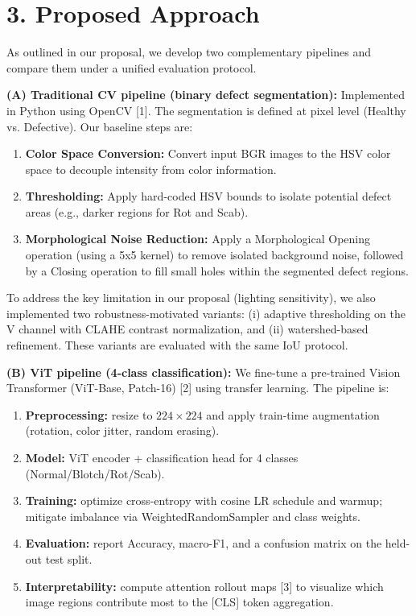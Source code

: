 \documentclass[11pt,letterpaper]{article}
\begin{document}
\section*{3. Proposed Approach}
As outlined in our proposal, we develop two complementary pipelines and compare them under a unified evaluation protocol.

\textbf{(A) Traditional CV pipeline (binary defect segmentation):} Implemented in Python using OpenCV [1]. The segmentation is defined at pixel level (Healthy vs. Defective). Our baseline steps are:
\begin{enumerate}[noitemsep, topsep=0pt]
    \item \textbf{Color Space Conversion:} Convert input BGR images to the HSV color space to decouple intensity from color information.
    \item \textbf{Thresholding:} Apply hard-coded HSV bounds to isolate potential defect areas (e.g., darker regions for Rot and Scab).
    \item \textbf{Morphological Noise Reduction:} Apply a Morphological Opening operation (using a 5x5 kernel) to remove isolated background noise, followed by a Closing operation to fill small holes within the segmented defect regions.
\end{enumerate}
To address the key limitation in our proposal (lighting sensitivity), we also implemented two robustness-motivated variants: (i) adaptive thresholding on the V channel with CLAHE contrast normalization, and (ii) watershed-based refinement. These variants are evaluated with the same IoU protocol.

\textbf{(B) ViT pipeline (4-class classification):} We fine-tune a pre-trained Vision Transformer (ViT-Base, Patch-16) [2] using transfer learning. The pipeline is:
\begin{enumerate}[noitemsep, topsep=0pt]
    \item \textbf{Preprocessing:} resize to $224\times 224$ and apply train-time augmentation (rotation, color jitter, random erasing).
    \item \textbf{Model:} ViT encoder + classification head for 4 classes (Normal/Blotch/Rot/Scab).
    \item \textbf{Training:} optimize cross-entropy with cosine LR schedule and warmup; mitigate imbalance via WeightedRandomSampler and class weights.
    \item \textbf{Evaluation:} report Accuracy, macro-F1, and a confusion matrix on the held-out test split.
    \item \textbf{Interpretability:} compute attention rollout maps [3] to visualize which image regions contribute most to the [CLS] token aggregation.
\end{enumerate}
\end{document}
